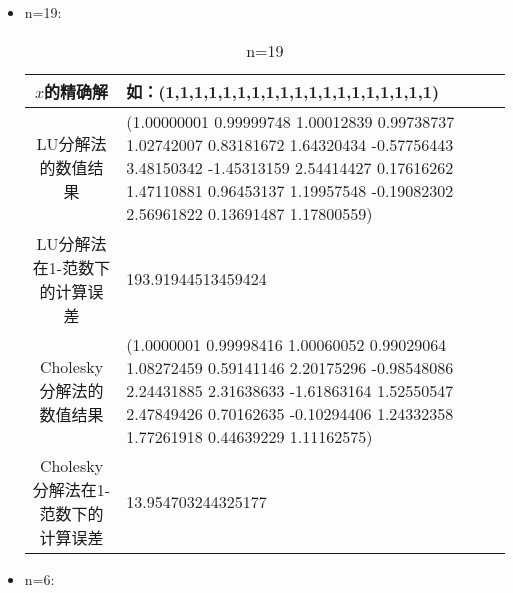 \documentclass[12pt]{article}
\begin{document}
\begin{itemize}
\item n=19:
\begin{table} [H]
\begin{center}
  \begin{tabularx}{\textwidth}{|c|X|} %
\hline
\color{blue}$x$的精确解 & \color{blue} 如：(1,1,1,1,1,1,1,1,1,1,1,1,1,1,1,1,1,1,1) \\
\hline
\color{blue}LU分解法的数值结果      &\color{blue} (1.00000001  0.99999748  1.00012839  0.99738737  1.02742007  0.83181672
1.64320434 -0.57756443  3.48150342 -1.45313159  2.54414427  0.17616262
1.47110881  0.96453137  1.19957548 -0.19082302  2.56961822  0.13691487
1.17800559) \\
\hline
\color{blue}LU分解法在1-范数下的计算误差     &\color{blue}193.91944513459424  \\
\hline
\color{blue}Cholesky分解法的数值结果      &\color{blue} (1.0000001   0.99998416  1.00060052  0.99029064  1.08272459  0.59141146
2.20175296 -0.98548086  2.24431885  2.31638633 -1.61863164  1.52550547
2.47849426  0.70162635 -0.10294406  1.24332358  1.77261918  0.44639229
1.11162575) \\
\hline
\color{blue}Cholesky分解法在1-范数下的计算误差      &\color{blue}13.954703244325177  \\
\hline
\end{tabularx}
\end{center}
\caption{n=19}
\end{table}

\item n=6:


\resizebox{\textwidth}{!}{$
L=
\left[ \begin{array}{cccccc}


\end{array}}
\end{itemize}
\end{document}
